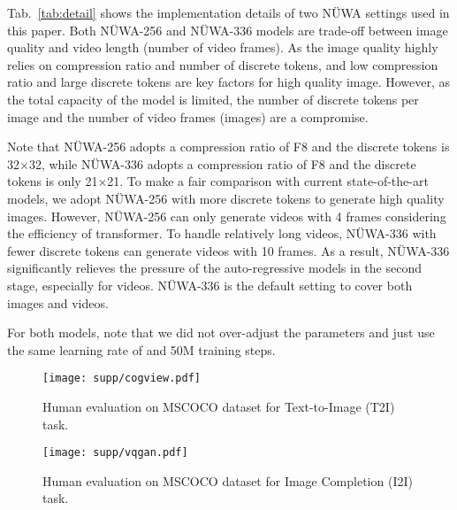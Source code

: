 \documentclass[10pt,twocolumn,letterpaper]{article}
\begin{document}
Tab.~\ref{tab:detail} shows the implementation details of two NÜWA settings used in this paper. Both NÜWA-256 and NÜWA-336 models are trade-off between image quality and video length (number of video frames). As the image quality highly relies on compression ratio and number of discrete tokens, and low compression ratio and large discrete tokens are key factors for high quality image. However, as the total capacity of the model is limited, the number of discrete tokens per image and the number of video frames (images) are a compromise.

Note that  NÜWA-256 adopts a compression ratio of F8 and the discrete tokens is 32×32, while NÜWA-336 adopts a compression ratio of F8 and the discrete tokens is only 21×21. To make a fair comparison with current state-of-the-art models, we adopt NÜWA-256 with more discrete tokens to generate high quality images. However, NÜWA-256 can only generate videos with 4 frames considering the efficiency of transformer. To handle relatively long videos, NÜWA-336 with 
fewer discrete tokens can generate videos with 10 frames. As a result, NÜWA-336 significantly relieves the pressure of the auto-regressive models in the second stage, especially for videos. NÜWA-336 is the default setting to cover both images and videos. 



For both models, note that we did not over-adjust the parameters and just use the same learning rate of  and 50M training steps.


\begin{figure}[t]
	\centering
	\texttt{[image: supp/cogview.pdf]}
	\caption{Human evaluation on MSCOCO dataset for Text-to-Image (T2I) task.}
	\label{fig:supp_cogview}
		\vspace{-4mm}

\end{figure}

\begin{figure}[t]
	\centering
	\texttt{[image: supp/vqgan.pdf]}
	\caption{Human evaluation on MSCOCO dataset for Image Completion (I2I) task.}
	\label{fig:supp_vqgan}
	\vspace{-4mm}
\end{figure}
\end{document}
